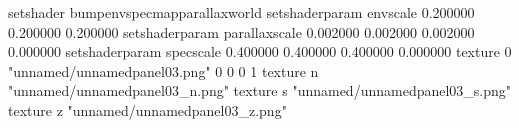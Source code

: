 setshader bumpenvspecmapparallaxworld
setshaderparam envscale 0.200000 0.200000 0.200000
setshaderparam parallaxscale 0.002000 0.002000 0.002000 0.000000
setshaderparam specscale 0.400000 0.400000 0.400000 0.000000
texture 0 "unnamed/unnamedpanel03.png" 0 0 0 1
texture n "unnamed/unnamedpanel03_n.png"
texture s "unnamed/unnamedpanel03_s.png"
texture z "unnamed/unnamedpanel03_z.png"